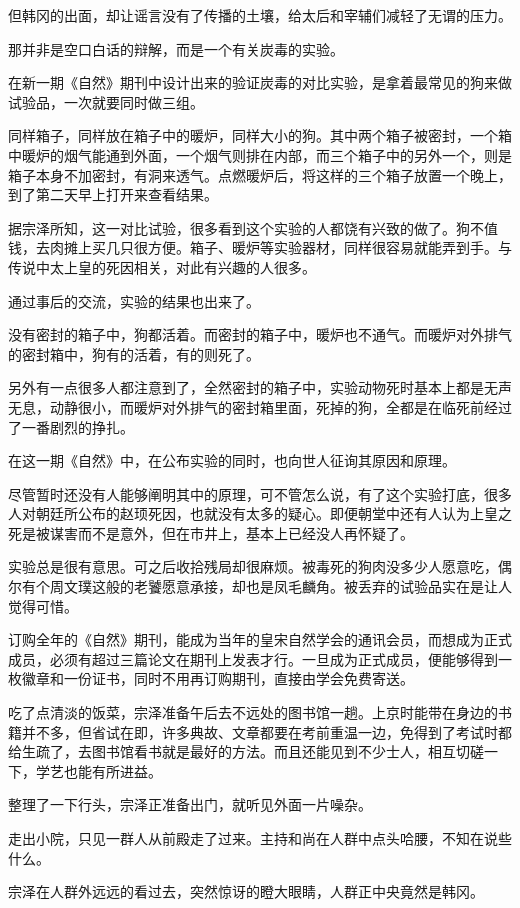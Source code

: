 但韩冈的出面，却让谣言没有了传播的土壤，给太后和宰辅们减轻了无谓的压力。

那并非是空口白话的辩解，而是一个有关炭毒的实验。

在新一期《自然》期刊中设计出来的验证炭毒的对比实验，是拿着最常见的狗来做试验品，一次就要同时做三组。

同样箱子，同样放在箱子中的暖炉，同样大小的狗。其中两个箱子被密封，一个箱中暖炉的烟气能通到外面，一个烟气则排在内部，而三个箱子中的另外一个，则是箱子本身不加密封，有洞来透气。点燃暖炉后，将这样的三个箱子放置一个晚上，到了第二天早上打开来查看结果。

据宗泽所知，这一对比试验，很多看到这个实验的人都饶有兴致的做了。狗不值钱，去肉摊上买几只很方便。箱子、暖炉等实验器材，同样很容易就能弄到手。与传说中太上皇的死因相关，对此有兴趣的人很多。

通过事后的交流，实验的结果也出来了。

没有密封的箱子中，狗都活着。而密封的箱子中，暖炉也不通气。而暖炉对外排气的密封箱中，狗有的活着，有的则死了。

另外有一点很多人都注意到了，全然密封的箱子中，实验动物死时基本上都是无声无息，动静很小，而暖炉对外排气的密封箱里面，死掉的狗，全都是在临死前经过了一番剧烈的挣扎。

在这一期《自然》中，在公布实验的同时，也向世人征询其原因和原理。

尽管暂时还没有人能够阐明其中的原理，可不管怎么说，有了这个实验打底，很多人对朝廷所公布的赵顼死因，也就没有太多的疑心。即便朝堂中还有人认为上皇之死是被谋害而不是意外，但在市井上，基本上已经没人再怀疑了。

实验总是很有意思。可之后收拾残局却很麻烦。被毒死的狗肉没多少人愿意吃，偶尔有个周文璞这般的老饕愿意承接，却也是凤毛麟角。被丢弃的试验品实在是让人觉得可惜。

订购全年的《自然》期刊，能成为当年的皇宋自然学会的通讯会员，而想成为正式成员，必须有超过三篇论文在期刊上发表才行。一旦成为正式成员，便能够得到一枚徽章和一份证书，同时不用再订购期刊，直接由学会免费寄送。

吃了点清淡的饭菜，宗泽准备午后去不远处的图书馆一趟。上京时能带在身边的书籍并不多，但省试在即，许多典故、文章都要在考前重温一边，免得到了考试时都给生疏了，去图书馆看书就是最好的方法。而且还能见到不少士人，相互切磋一下，学艺也能有所进益。

整理了一下行头，宗泽正准备出门，就听见外面一片噪杂。

走出小院，只见一群人从前殿走了过来。主持和尚在人群中点头哈腰，不知在说些什么。

宗泽在人群外远远的看过去，突然惊讶的瞪大眼睛，人群正中央竟然是韩冈。

